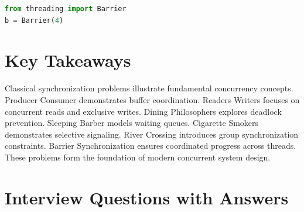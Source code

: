 \begin{lstlisting}[language=Python,style=interviewcode]
from threading import Barrier
b = Barrier(4)
\end{lstlisting}

\section{Key Takeaways}

\begin{keytakeaways}
Classical synchronization problems illustrate fundamental concurrency concepts. Producer Consumer demonstrates buffer coordination. Readers Writers focuses on concurrent reads and exclusive writes. Dining Philosophers explores deadlock prevention. Sleeping Barber models waiting queues. Cigarette Smokers demonstrates selective signaling. River Crossing introduces group synchronization constraints. Barrier Synchronization ensures coordinated progress across threads. These problems form the foundation of modern concurrent system design.
\end{keytakeaways}

\section{Interview Questions with Answers}


